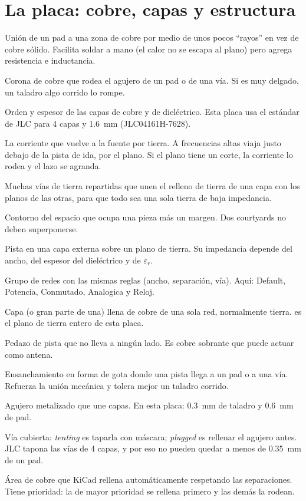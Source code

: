\section*{La placa: cobre, capas y estructura}
\begin{description}[style=sameline,leftmargin=1.5em,labelindent=0pt]
  \item[Alivio térmico] Unión de un pad a una zona de cobre por medio de unos pocos ``rayos'' en vez de cobre sólido.
  Facilita soldar a mano (el calor no se escapa al plano) pero agrega resistencia e inductancia.
  \item[Anillo anular] Corona de cobre que rodea el agujero de un pad o de una vía. Si es muy delgado, un taladro algo
  corrido lo rompe.
  \item[Apilado (stackup)] Orden y espesor de las capas de cobre y de dieléctrico. Esta placa usa el estándar de JLC para
  4 capas y \SI{1.6}{\milli\meter} (JLC04161H-7628).
  \item[Corriente de retorno] La corriente que vuelve a la fuente por tierra. A frecuencias altas viaja justo debajo de
  la pista de ida, por el plano. Si el plano tiene un corte, la corriente lo rodea y el lazo se agranda.
  \item[Cosido (stitching)] Muchas vías de tierra repartidas que unen el relleno de tierra de una capa con los planos de
  las otras, para que todo sea una sola tierra de baja impedancia.
  \item[Courtyard] Contorno del espacio que ocupa una pieza más un margen. Dos courtyards no deben superponerse.
  \item[Microstrip] Pista en una capa externa sobre un plano de tierra. Su impedancia depende del ancho, del espesor del
  dieléctrico y de $\varepsilon_r$.
  \item[Net class (clase de red)] Grupo de redes con las mismas reglas (ancho, separación, vía). Aquí: Default, Potencia,
  Conmutado, Analogica y Reloj.
  \item[Plano] Capa (o gran parte de una) llena de cobre de una sola red, normalmente tierra.  es el plano
  de tierra entero de esta placa.
  \item[Stub] Pedazo de pista que no lleva a ningún lado. Es cobre sobrante que puede actuar como antena.
  \item[Teardrop] Ensanchamiento en forma de gota donde una pista llega a un pad o a una vía. Refuerza la unión
  mecánica y tolera mejor un taladro corrido.
  \item[Vía] Agujero metalizado que une capas. En esta placa: \SI{0.3}{\milli\meter} de taladro y \SI{0.6}{\milli\meter}
  de pad.
  \item[Vía taponada (plugged) / tenting] Vía cubierta: \emph{tenting} es taparla con máscara; \emph{plugged} es rellenar
  el agujero antes. JLC tapona las vías de 4 capas, y por eso no pueden quedar a menos de \SI{0.35}{\milli\meter} de
  un pad.
  \item[Zona] Área de cobre que KiCad rellena automáticamente respetando las separaciones. Tiene prioridad: la de mayor
  prioridad se rellena primero y las demás la rodean.
\end{description}

